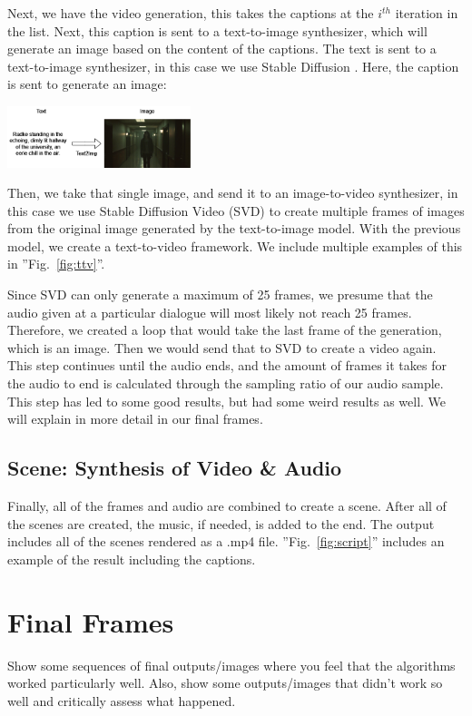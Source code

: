 \documentclass[conference]{IEEEtran}
\begin{document}
Next, we have the video generation, this takes the captions at the $i^{th}$ iteration in the list. Next, this caption is sent to a text-to-image synthesizer, which will generate an image based on the content of the captions. The text is sent to a text-to-image synthesizer, in this case we use Stable Diffusion \cite{stablediffusion}. Here, the caption is sent to generate an image:

\begin{center}
\includegraphics[width=0.4\textwidth]{imgs/final-intermediate/t2i_intermediate.png}\\
\end{center}

Then, we take that single image, and send it to an image-to-video synthesizer, in this case we use Stable Diffusion Video \cite{svd} (SVD) to create multiple frames of images from the original image generated by the text-to-image model. With the previous model, we create a text-to-video framework. We include multiple examples of this in ''Fig.~\ref{fig:ttv}''.

Since SVD can only generate a maximum of 25 frames, we presume that the audio given at a particular dialogue will most likely not reach 25 frames. Therefore, we created a loop that would take the last frame of the generation, which is an image. Then we would send that to SVD to create a video again. This step continues until the audio ends, and the amount of frames it takes for the audio to end is calculated through the sampling ratio of our audio sample. This step has led to some good results, but had some weird results as well. We will explain in more detail in our final frames.

\subsection{Scene: Synthesis of Video \& Audio}

Finally, all of the frames and audio are combined to create a scene. After all of the scenes are created, the music, if needed, is added to the end. The output includes all of the scenes rendered as a .mp4 file. ''Fig.~\ref{fig:script}'' includes an example of the result including the captions.

\section{Final Frames}
\begin{tcolorbox}
Show some sequences of final outputs/images where you feel that the algorithms worked particularly well. Also, show some outputs/images that didn’t work so well and critically assess what happened.
\end{tcolorbox}
\end{document}
